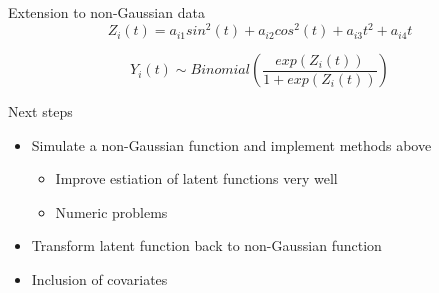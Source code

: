 \documentclass[
  ignorenonframetext,
]{beamer}
\providecommand{\tightlist}{%
  \setlength{\itemsep}{0pt}\setlength{\parskip}{0pt}}
\begin{document}
\begin{frame}{Extension to non-Gaussian data}
\protect\hypertarget{extension-to-non-gaussian-data-1}{}
\[Z_i(t) = a_{i1}sin^2(t)+a_{i2}cos^2(t)+a_{i3}t^2+a_{i4}t\]

\[Y_i(t) \sim Binomial(\frac{exp(Z_i(t))}{1+exp(Z_i(t))})\]
\end{frame}

\begin{frame}{Next steps}
\protect\hypertarget{next-steps}{}
\begin{itemize}
\tightlist
\item
  Simulate a non-Gaussian function and implement methods above

  \begin{itemize}
  \tightlist
  \item
    Improve estiation of latent functions very well
  \item
    Numeric problems
  \end{itemize}
\item
  Transform latent function back to non-Gaussian function
\item
  Inclusion of covariates
\end{itemize}
\end{frame}
\end{document}
